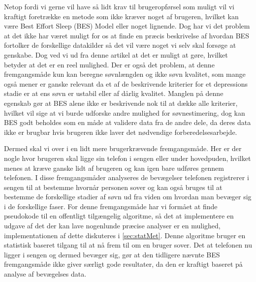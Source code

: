 Netop fordi vi gerne vil have så lidt krav til brugeropførsel som muligt vil vi kraftigt foretrække en metode som ikke kræver noget af brugeren, hvilket kan være Best Effort Sleep (BES) Model eller noget lignende. 
Dog har vi det problem at det ikke har været muligt for os at finde en præcis beskrivelse af hvordan BES fortolker de forskellige datakilder så det vil være noget vi selv skal forsøge at genskabe.
Dog ved vi ud fra denne artikel at det er muligt at gøre, hvilket betyder at det er en reel mulighed.
Der er også det problem, at denne fremgangsmåde kun kan beregne søvnlængden og ikke søvn kvalitet, som mange også mener er ganske relevant da et af de beskrivende kriterier for et depressions stadie er at ens søvn er ustabil eller af dårlig kvalitet.
Manglen på denne egenskab gør at BES alene ikke er beskrivende nok til at dække alle kriterier, hvilket vil sige at vi burde udforske andre mulighed for søvnestimering, dog kan BES godt beholdes som en måde at validere data fra de andre dele, da deres data ikke er brugbar hvis brugeren ikke laver det nødvendige forberedelsesarbejde.

Dermed skal vi over i en lidt mere brugerkrævende fremgangsmåde.
Her er der nogle hvor brugeren skal ligge sin telefon i sengen eller under hovedpuden, hvilket menes at kræve ganske lidt af brugeren og kan igen bare udføres gennem telefonen.
I disse fremgangsmåder analyseres de bevægelser telefonen registrerer i sengen til at bestemme hvornår personen sover og kan også bruges til at bestemme de forskellige stadier af søvn ud fra viden om hvordan man bevæger sig i de forskellige faser.
For denne fremgangsmåde har vi formået at finde pseudokode til en offentligt tilgængelig algoritme, så det at implementere en udgave af det der kan lave nogenlunde præcise analyser er en mulighed, implementationen af dette diskuteres i \cref{sec:statMet}.
Denne algoritme bruger en statistisk baseret tilgang til at nå frem til om en bruger sover.
Det at telefonen nu ligger i sengen og dermed bevæger sig, gør at den tidligere nævnte BES fremgangsmåde ikke giver særligt gode resultater, da den er kraftigt baseret på analyse af bevægelses data.

